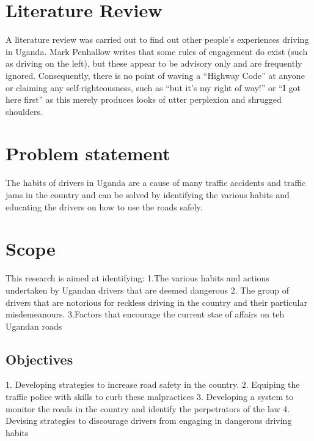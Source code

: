 \documentclass{article}                    %
\begin{document}
\section{Literature Review}
A literature review was carried out to find out other people's experiences driving in Uganda.
Mark Penhallow writes that some rules of engagement do exist (such as driving on the left), but these appear to be advisory only and are frequently ignored. Consequently, there is no point of waving a “Highway Code” at anyone or claiming any self-righteousness, such as “but it’s my right of way!” or “I got here first” as this merely produces looks of utter perplexion and shrugged shoulders.
\section{Problem statement  }
The habits of drivers in Uganda are a cause of many traffic accidents and traffic jams in the country and can be solved by identifying the various habits and educating the drivers on how to use the roads safely.
\section{Scope}
This research is aimed at identifying:
\vspace{1.08\baselineskip}
{\newline}
1.The various habits and actions undertaken by Ugandan drivers that are deemed dangerous
\vspace{1.08\baselineskip}
{\newline}
2. The group of drivers that are notorious for reckless driving in the country and their particular misdemeanours.
\vspace{1.08\baselineskip}
{\newline}
3.Factors that encourage the current stae of affairs on teh Ugandan roads
\subsection{Objectives}
1. Developing strategies to increase road safety in the country.
\vspace{1.08\baselineskip}
{\newline}
2. Equiping the traffic police with skills to curb these malpractices 
\vspace{1.08\baselineskip}
{\newline}
3. Developing a system to monitor the roads in the country and identify the perpetrators of the law
\vspace{1.08\baselineskip}
{\newline}
4. Devising strategies to discourage drivers from engaging in dangerous driving habits
\end{document}
